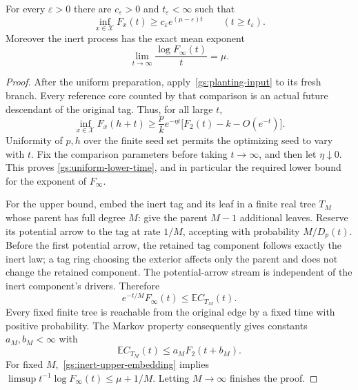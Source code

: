\begin{theorem}
\label{gs:inert-mu}
For every $\varepsilon>0$ there are $c_\varepsilon>0$ and
$t_\varepsilon<\infty$ such that
\begin{equation}\label{gs:uniform-lower-time}
 \inf_{x\in\mathcal X}F_x(t)
       \ge c_\varepsilon e^{(\mu-\varepsilon)t}
       \qquad(t\ge t_\varepsilon).
\end{equation}
Moreover the inert process has the exact mean exponent
\begin{equation}\label{gs:inert-mean-limit}
 \lim_{t\to\infty}\frac{\log F_\infty(t)}t=\mu.
\end{equation}
\end{theorem}

\begin{proof}
After the uniform preparation, apply~\eqref{gs:planting-input} to its
fresh branch. Every reference core counted by that comparison is an
actual future descendant of the original tag. Thus, for all large $t$,
\begin{equation}\label{gs:uniform-planted-bound}
 \inf_{x\in\mathcal X}F_x(h+t)
 \ge\frac pk e^{-\eta t}
          \bigl[F_2(t)-k-O(e^{-t})\bigr].
\end{equation}
Uniformity of $p,h$ over the finite seed set permits the optimizing
seed to vary with $t$. Fix the comparison parameters before taking
$t\to\infty$, and then let $\eta\downarrow0$. This proves
\eqref{gs:uniform-lower-time}, and in particular the required lower
bound for the exponent of $F_\infty$.

For the upper bound, embed the inert tag and its leaf in a finite real
tree $T_M$ whose parent has full degree $M$: give the parent $M-1$
additional leaves. Reserve its potential arrow to the tag at rate
$1/M$, accepting with probability $M/D_p(t)$. Before the first
potential arrow, the retained tag component follows exactly the inert
law; a tag ring choosing the exterior affects only the parent and
does not change the retained component. The potential-arrow stream is
independent of the inert component's drivers. Therefore
\begin{equation}\label{gs:inert-upper-embedding}
 e^{-t/M}F_\infty(t)\le\mathbb E C_{T_M}(t).
\end{equation}
Every fixed finite tree is reachable from the original edge by a fixed
time with positive probability. The Markov property consequently gives
constants $a_M,b_M<\infty$ with
\[
 \mathbb E C_{T_M}(t)\le a_MF_2(t+b_M).
\]
For fixed $M$,~\eqref{gs:inert-upper-embedding} implies
$\limsup t^{-1}\log F_\infty(t)\le\mu+1/M$. Letting $M\to\infty$
finishes the proof.
\end{proof}

